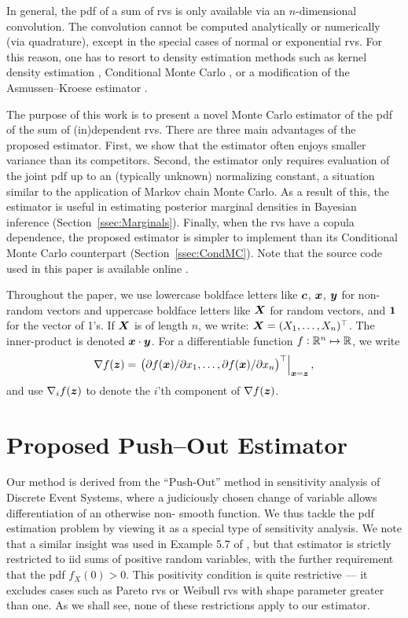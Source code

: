 In general, the pdf of a sum of rvs is only available via an $n$-dimensional convolution.
The convolution  cannot be computed  analytically  or numerically (via quadrature), except in the special cases of normal or exponential rvs. For this reason, one has to resort to density estimation methods such as kernel density estimation \cite{botev2010kernel}, Conditional Monte Carlo \cite{asmussen2017conditional}, or a modification of the Asmussen--Kroese estimator \cite{Asmussen2006}. 


The purpose of this work is to  present a novel Monte Carlo estimator of the pdf of the sum of (in)dependent  rvs. There are three main  advantages of the proposed estimator. First,
we show that the estimator often enjoys smaller variance than its competitors.
Second,  the estimator only requires  evaluation of   the joint pdf up 
to an (typically unknown) normalizing constant, a situation similar to the application of Markov chain Monte Carlo. As a result of this, the estimator is useful in estimating posterior marginal densities in Bayesian inference (Section~\ref{ssec:Marginals}).  Finally, when the rvs have a copula dependence, the proposed estimator is simpler to implement than its Conditional Monte Carlo counterpart (Section~\ref{ssec:CondMC}). 
Note that the source code used in this paper is available online \cite{PushoutCode}.




Throughout the paper, we use lowercase boldface letters like $\boldsymbol{c}$, $\boldsymbol{x}$, $\boldsymbol{y}$ for non-random vectors and uppercase boldface letters like $\boldsymbol{X}$ for random vectors, and $\boldsymbol{1}$ for the vector of 1's. If $\boldsymbol{X}$ is of length $n$, we write:  $\boldsymbol{X}=(X_1, \dots, X_n)^\top$. The inner-product is denoted  $\boldsymbol{x} \cdot \boldsymbol{y}$. For a differentiable  function $f: \mathbb{R}^n\mapsto \mathbb{R}$, we write
\[ \nabla f(\boldsymbol{z}) = \left. \left( \partial f(\boldsymbol{x}) / \partial x_1 , \dots, \partial f(\boldsymbol{x}) / \partial x_n \right)^\top \right\vert_{\boldsymbol{x} = \boldsymbol{z}}, \] 
and use $\nabla_i f(\boldsymbol{z})$ to denote the $i$'th component of $\nabla f(\boldsymbol{z})$. 


\section{Proposed Push--Out Estimator} \label{sec:GeneralSetup}
Our method is derived from the ``Push-Out'' method \cite{RubinsteinReuven1992Saod,kroese2007solutions} in  sensitivity analysis of Discrete Event Systems, where a judiciously chosen change of variable  allows differentiation of an otherwise non-
smooth function. We thus tackle the pdf estimation problem by 
viewing it as a special type of  sensitivity analysis. We note 
that a similar insight was used in  Example 5.7 of \cite{
asmussen2007stochastic}, but that estimator is strictly 
restricted to iid sums of positive random variables, with the 
further requirement that the pdf $f_X(0) > 0$. This positivity 
condition is quite restrictive ---  it excludes cases such as 
Pareto rvs or  Weibull rvs with shape parameter greater than 
one. As we shall see, none of these restrictions apply to our  
estimator.




